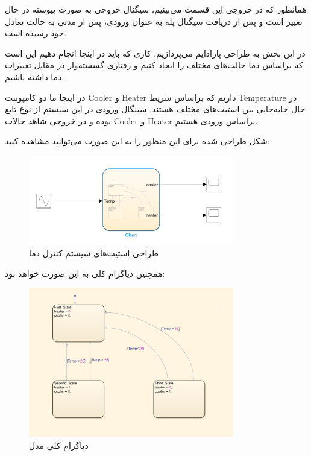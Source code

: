 همانطور که در خروجی این قسمت می‌بینیم، سیگنال خروجی به صورت پیوسته در حال تغییر است و پس از دریافت سیگنال پله به عنوان ورودی، پس از مدتی به حالت تعادل خود رسیده است.

در این بخش به طراحی پارادایم
می‌پردازیم. کاری که باید در اینجا انجام دهیم این است که براساس دما حالت‌های مختلف را ایجاد کنیم و رفتاری گسسته‌وار در مقابل تغییرات دما داشته باشیم.

در اینجا ما دو کامپوننت
Cooler
و
Heater
داریم که براساس شریط 
Temperature
در حال جابه‌جایی بین استیت‌های مختلف هستند. سینگال ورودی در این سیستم از نوع تابع
بوده و در خروجی شاهد حالات
Cooler
و
Heater
براساس ورودی هستیم.

شکل
طراحی شده برای این منظور را به این صورت می‌توانید مشاهده کنید:

\begin{figure}[H]
    \centering
    \includegraphics[width = 0.8\textwidth]{commons/image3.png}
    \caption{طراحی استیت‌های سیستم کنترل دما}
\end{figure}

همچنین دیاگرام کلی به این صورت خواهد بود:

\begin{figure}[H]
    \centering
    \includegraphics[width = 0.8\textwidth]{commons/image4.png}
    \caption{دیاگرام کلی مدل}
\end{figure}

